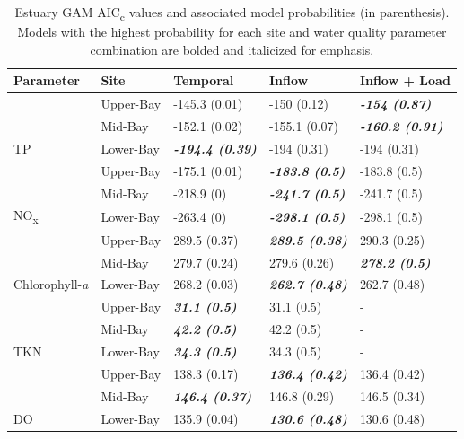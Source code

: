 \documentclass[fleqn,10pt,lineno]{wlpeerj} %
\begin{document}
\begin{table}

\caption{\label{tab:table4}Estuary GAM AIC\textsubscript{c} values and associated model probabilities (in parenthesis). Models with the highest probability for each site and water quality parameter combination are bolded and italicized for emphasis.}
\centering
\begin{tabular}[t]{ll>{}l>{}l>{}l}
\toprule
Parameter & Site & Temporal & Inflow & Inflow + Load\\
\midrule
 & Upper-Bay & -145.3 (0.01) & -150 (0.12) & \em{\textbf{-154 (0.87)}}\\

 & Mid-Bay & -152.1 (0.02) & -155.1 (0.07) & \em{\textbf{-160.2 (0.91)}}\\

\multirow{-3}{*}{\raggedright\arraybackslash TP} & Lower-Bay & \em{\textbf{-194.4 (0.39)}} & -194 (0.31) & -194 (0.31)\\
\cmidrule{1-5}
 & Upper-Bay & -175.1 (0.01) & \em{\textbf{-183.8 (0.5)}} & -183.8 (0.5)\\

 & Mid-Bay & -218.9 (0) & \em{\textbf{-241.7 (0.5)}} & -241.7 (0.5)\\

\multirow{-3}{*}{\raggedright\arraybackslash NO\textsubscript{x}} & Lower-Bay & -263.4 (0) & \em{\textbf{-298.1 (0.5)}} & -298.1 (0.5)\\
\cmidrule{1-5}
 & Upper-Bay & 289.5 (0.37) & \em{\textbf{289.5 (0.38)}} & 290.3 (0.25)\\

 & Mid-Bay & 279.7 (0.24) & 279.6 (0.26) & \em{\textbf{278.2 (0.5)}}\\

\multirow{-3}{*}{\raggedright\arraybackslash Chlorophyll-\textit{a}} & Lower-Bay & 268.2 (0.03) & \em{\textbf{262.7 (0.48)}} & 262.7 (0.48)\\
\cmidrule{1-5}
 & Upper-Bay & \em{\textbf{31.1 (0.5)}} & 31.1 (0.5) & -\\

 & Mid-Bay & \em{\textbf{42.2 (0.5)}} & 42.2 (0.5) & -\\

\multirow{-3}{*}{\raggedright\arraybackslash TKN} & Lower-Bay & \em{\textbf{34.3 (0.5)}} & 34.3 (0.5) & -\\
\cmidrule{1-5}
 & Upper-Bay & 138.3 (0.17) & \em{\textbf{136.4 (0.42)}} & 136.4 (0.42)\\

 & Mid-Bay & \em{\textbf{146.4 (0.37)}} & 146.8 (0.29) & 146.5 (0.34)\\

\multirow{-3}{*}{\raggedright\arraybackslash DO} & Lower-Bay & 135.9 (0.04) & \em{\textbf{130.6 (0.48)}} & 130.6 (0.48)\\
\bottomrule
\end{tabular}
\end{table}
\end{document}
